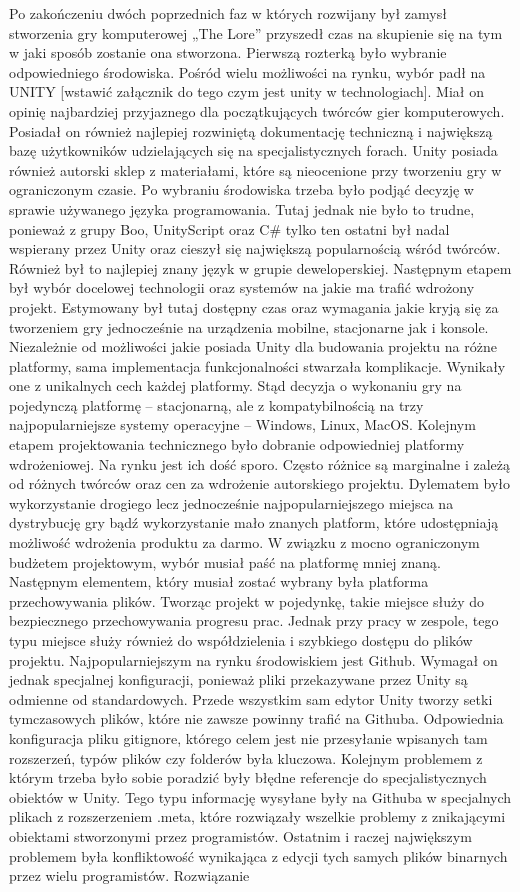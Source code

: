 \documentclass[oneside,polski,logo]{amuthesis}
\begin{document}
Po zakończeniu dwóch poprzednich faz w których rozwijany był zamysł stworzenia gry komputerowej „The Lore” przyszedł czas na skupienie się na tym w jaki sposób zostanie ona stworzona. Pierwszą rozterką było wybranie odpowiedniego środowiska. Pośród wielu możliwości na rynku, wybór padł na UNITY [wstawić załącznik do tego czym jest unity w technologiach]. Miał on opinię najbardziej przyjaznego dla początkujących twórców gier komputerowych. Posiadał on również najlepiej rozwiniętą dokumentację techniczną i największą bazę użytkowników udzielających się na specjalistycznych forach. Unity posiada również autorski sklep z materiałami, które są nieocenione przy tworzeniu gry w ograniczonym czasie. Po wybraniu środowiska trzeba było podjąć decyzję w sprawie używanego języka programowania. Tutaj jednak nie było to trudne, ponieważ z grupy Boo, UnityScript oraz C\# tylko ten ostatni był nadal wspierany przez Unity oraz cieszył się największą popularnością wśród twórców. Również był to najlepiej znany język w grupie deweloperskiej. Następnym etapem był wybór docelowej technologii oraz systemów na jakie ma trafić wdrożony projekt. Estymowany był tutaj dostępny czas oraz wymagania jakie kryją się za tworzeniem gry jednocześnie na urządzenia mobilne, stacjonarne jak i konsole. Niezależnie od możliwości jakie posiada Unity dla budowania projektu na różne platformy, sama implementacja funkcjonalności stwarzała komplikacje. Wynikały one z unikalnych cech każdej platformy. Stąd decyzja o wykonaniu gry na pojedynczą platformę – stacjonarną, ale z kompatybilnością na trzy najpopularniejsze systemy operacyjne – Windows, Linux, MacOS. Kolejnym etapem projektowania technicznego było dobranie odpowiedniej platformy wdrożeniowej. Na rynku jest ich dość sporo. Często różnice są marginalne i zależą od różnych twórców oraz cen za wdrożenie autorskiego projektu. Dylematem było wykorzystanie drogiego lecz jednocześnie najpopularniejszego miejsca na dystrybucję gry bądź wykorzystanie mało znanych platform, które udostępniają możliwość wdrożenia produktu za darmo. W związku z mocno ograniczonym budżetem projektowym, wybór musiał paść na platformę mniej znaną. Następnym elementem, który musiał zostać wybrany była platforma przechowywania plików. Tworząc projekt w pojedynkę, takie miejsce służy do bezpiecznego przechowywania progresu prac. Jednak przy pracy w zespole, tego typu miejsce służy również do współdzielenia i szybkiego dostępu do plików projektu. Najpopularniejszym na rynku środowiskiem jest Github. Wymagał on jednak specjalnej konfiguracji, ponieważ pliki przekazywane przez Unity są odmienne od standardowych. Przede wszystkim sam edytor Unity tworzy setki tymczasowych plików, które nie zawsze powinny trafić na Githuba. Odpowiednia konfiguracja pliku gitignore, którego celem jest nie przesyłanie wpisanych tam rozszerzeń, typów plików czy folderów była kluczowa. Kolejnym problemem z którym trzeba było sobie poradzić były błędne referencje do specjalistycznych obiektów w Unity. Tego typu informację wysyłane były na Githuba w specjalnych plikach z rozszerzeniem .meta, które rozwiązały wszelkie problemy z znikającymi obiektami stworzonymi przez programistów. Ostatnim i raczej największym problemem była konfliktowość wynikająca z edycji tych samych plików binarnych przez wielu programistów. Rozwiązanie 
\end{document}
